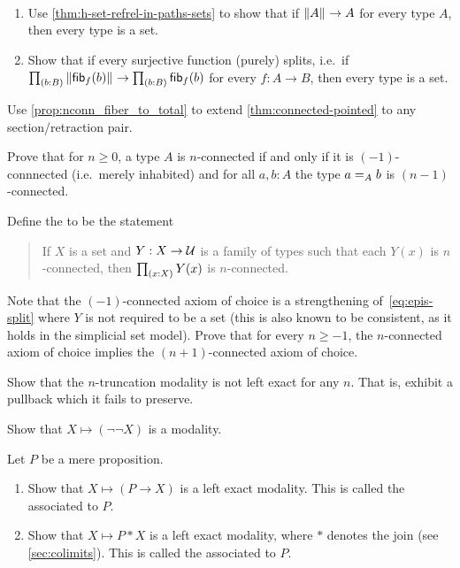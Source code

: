 \sectionExercises

\begin{ex}\ 
  \begin{enumerate}
    \item Use \autoref{thm:h-set-refrel-in-paths-sets} to show 
    that if $\brck{A}\to A$ for every type $A$, 
    then every type is a set.
    \item Show that if every surjective function (purely) splits, 
    i.e.~if $\prd{b:B}\brck{\hfib{f}{b}}\to\prd{b:B}\hfib{f}{b}$
    for every $f:A\to B$, then every type is a set.
  \end{enumerate}
\end{ex}

\begin{ex}
  Use \autoref{prop:nconn_fiber_to_total} to extend \autoref{thm:connected-pointed} to any section/retraction pair.
\end{ex}

\begin{ex}
  Prove that for $n\ge 0$, a type $A$ is $n$-connected if and only if it is $(-1)$-connnected (i.e.\ merely inhabited) and for all $a,b:A$ the type $\id[A]ab$ is $(n-1)$-connected.
\end{ex}

\begin{ex}
  Define the  to be the statement
  \begin{quote}
    If $X$ is a set and $Y:X\to \type$ is a family of types such that each $Y(x)$ is $n$-connected, then $\prd{x:X} Y(x)$ is $n$-connected.
  \end{quote}
  Note that the $(-1)$-connected axiom of choice is a strengthening of~\eqref{eq:epis-split} where $Y$ is not required to be a set (this is also known to be consistent, as it holds in the simplicial set model).
  Prove that for every $n\ge -1$, the $n$-connected axiom of choice implies the $(n+1)$-connected axiom of choice.
\end{ex}

\begin{ex}
  Show that the $n$-truncation modality is not left exact for any $n$.
  That is, exhibit a pullback which it fails to preserve.
\end{ex}

\begin{ex}
  Show that $X\mapsto (\neg\neg X)$ is a modality.
\end{ex}

\begin{ex}
  Let $P$ be a mere proposition.
  \begin{enumerate}
  \item Show that $X\mapsto (P\to X)$ is a left exact modality.
    This is called the  associated to $P$.
  \item Show that $X\mapsto P*X$ is a left exact modality, where $*$ denotes the join (see \autoref{sec:colimits}).
    This is called the \define{closed modality} associated to $P$.
  \end{enumerate}
\end{ex}


